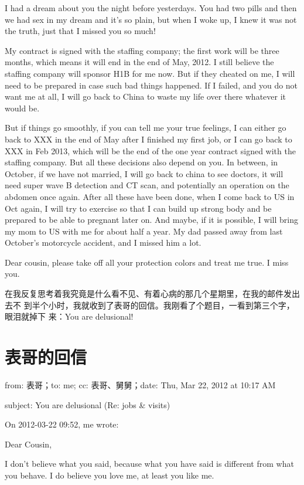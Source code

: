 \documentclass[12pt]{book}
\begin{document}
I had a dream about you the night before yesterdays. You had two pills and 
then we had sex in my dream and it’s so plain, but when I woke up, I knew 
it was not the truth, just that I missed you so much!

My contract is signed with the staffing company; the first work will be 
three months, which means it will end in the end of May, 2012. I still 
believe the staffing company will sponsor H1B for me now. But if they 
cheated on me, I will need to be prepared in case such bad things happened. 
If I failed, and you do not want me at all, I will go back to China to waste
my life over there whatever it would be. 

But if things go smoothly, if you can tell me your true feelings, I can 
either go back to XXX in the end of May after I finished my first job, or I 
can go back to XXX in Feb 2013, which will be the end of the one year 
contract signed with the staffing company. But all these decisions also 
depend on you. In between, in October, if we have not married, I will go 
back to china to see doctors, it will need super wave B detection and CT 
scan, and potentially an operation on the abdomen once again. After all 
these have been done, when I come back to US in Oct again, I will try to 
exercise so that I can build up strong body and be prepared to be able to 
pregnant later on. And maybe, if it is possible, I will bring my mom to US 
with me for about half a year. My dad passed away from last October's 
motorcycle accident, and I missed him a lot. 

Dear cousin, please take off all your protection colors and treat me true. I
miss you.

在我反复思考着我究竟是什么看不见、有着心病的那几个星期里，在我的邮件发出去不
到半个小时，我就收到了表哥的回信。我刚看了个题目，一看到第三个字，眼泪就掉下
来：You are delusional!
\section{表哥的回信}
\label{sec-9-69}

from: 表哥；to: me; cc: 表哥、舅舅；date: Thu, Mar 22, 2012 at 10:17 AM

subject: You are delusional (Re: jobs \& visits)

On 2012-03-22 09:52, me wrote:

Dear Cousin,

I don't believe what you said, because what you have said is different from 
what you behave. I do believe you love me, at least you like me.
\end{document}
